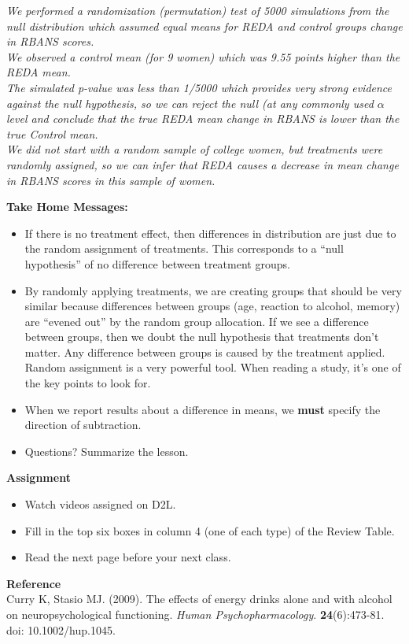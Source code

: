 \begin{enumerate}
\begin{key}
  {\it 
We performed a randomization (permutation) test of 5000 simulations
from the null distribution which assumed equal means for REDA and
control groups change in RBANS scores.\\
We observed a control mean (for 9 women) which was 9.55 points higher
than the REDA mean.\\
The simulated p-value was less than 1/5000 which provides very strong
evidence against the null hypothesis, so we can reject the null (at
any commonly used $\alpha$ level and conclude that the true REDA mean
change in RBANS is lower than the true Control mean.\\
We did not start with a random sample of college women, but treatments
were randomly assigned, so we can infer that REDA causes a decrease in
mean change in RBANS scores in this sample of women.
}
\end{key}


 \end{enumerate}


{\sf\bf Take Home Messages:}
\begin{itemize}
  \item 
  If there is no treatment effect, then differences in distribution
  are just due to the random assignment of treatments.  This
  corresponds to a ``null hypothesis'' of no difference between
  treatment groups.
\item  By randomly applying treatments, we are creating groups that
  should be very similar because differences between groups (age,
  reaction to alcohol, memory) are “evened out” by the random group
  allocation. If we see a difference between groups, then we doubt the
  null hypothesis that treatments don't matter.  Any difference
  between groups is caused by the treatment applied.  Random
  assignment is a very powerful tool.  When reading a study, it's one
  of the key points to look for. 
 \item When we report results about a difference in means, we {\bf
     must} specify the direction of subtraction. 
 \item 
  Questions? Summarize  the  lesson. \vfill

\end{itemize}



\noindent
{\bf Assignment} \vspace{-.2in}
\begin{itemize}
\item Watch videos assigned on D2L.
\item Fill in the top six  boxes in column 4 (one  of each type) of
  the Review Table.   
\item Read the next page before your next class.
\end{itemize}


{\sf\bf Reference}
\\
 Curry K, Stasio MJ.  (2009). The effects of energy drinks alone and with
 alcohol on neuropsychological functioning. {\it Human  Psychopharmacology}.
{\bf 24}(6):473-81. doi: 10.1002/hup.1045. 


